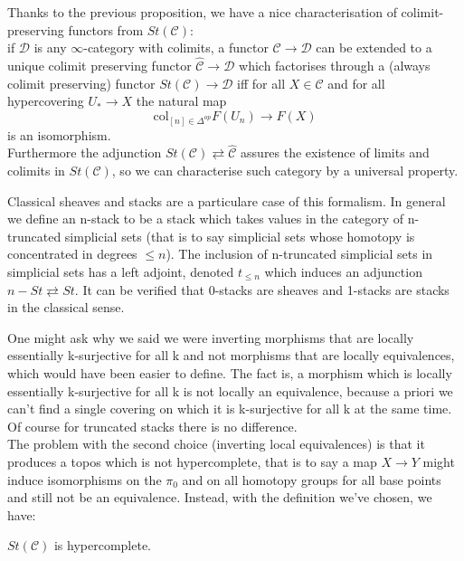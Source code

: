 \begin{refsection}
\begin{rmk}
Thanks to the previous proposition, we have a nice characterisation of colimit-preserving functors from $St(\mathcal C)$:\\
if $\mathcal{D}$ is any $\infty$-category with colimits, a functor $\mathcal C\to\mathcal{D}$ can be extended to a unique colimit preserving functor $\hat{\mathcal C}\to\mathcal{D}$ which
factorises through a (always colimit preserving) functor $St(\mathcal C)\to \mathcal{D}$ iff for all $X\in\mathcal C$ and for all hypercovering $U_*\to X$ the natural map
$$\mathrm{col}_{[n]\in\Delta^{op}} F(U_n)\to F(X)$$
is an isomorphism.\\
Furthermore the adjunction $St(\mathcal C)\rightleftarrows \hat{\mathcal C}$ assures the existence of limits and colimits in $St(\mathcal C)$, so we can characterise such category by a
universal property.
\end{rmk}

\begin{rmk}
Classical sheaves and stacks are a particulare case of this formalism. In general we define an n-stack to be a stack which takes values in the category of n-truncated
simplicial sets (that is to say simplicial sets whose homotopy is concentrated in degrees $\le n$). The inclusion of n-truncated simplicial sets in simplicial sets has a left 
adjoint, denoted $t_{\le n}$ which induces an adjunction $n-St\rightleftarrows St$. It can be verified that 0-stacks are sheaves and 1-stacks are stacks in the classical sense.
\end{rmk}

One might ask why we said we were inverting morphisms that are locally essentially k-surjective for all k and not morphisms that are locally equivalences, which would have been easier to define.
The fact is, a morphism which is locally essentially k-surjective for all k is not locally an equivalence, because a priori we can't find a single covering on which it
is k-surjective for all k at the same time. Of course for truncated stacks there is no difference.\\
The problem with the second choice (inverting local equivalences) is that it produces a topos which is not hypercomplete, that is to say a map $X\to Y$ might induce
isomorphisms on the $\pi_0$ and on all homotopy groups for all base points and still not be an equivalence. Instead, with the definition we've chosen, we have:

\begin{prop}
$St(\mathcal C)$ is hypercomplete.
\end{prop}



\end{refsection}
